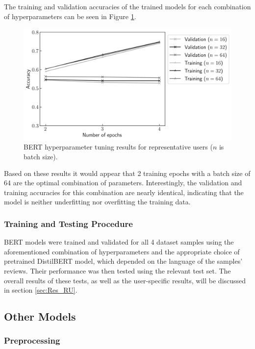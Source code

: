 The training and validation accuracies of the trained models for each combination of hyperparameters can be seen in Figure \ref{fig:DI_PU_BERTHP}.

\begin{figure}[ht]
    \centering
    \includegraphics[scale=0.7]{figures/05_impl/02_pu/plot_hyperparams_bert.png}
    \caption{BERT hyperparameter tuning results for representative users ($n$ is batch size).}
    \label{fig:DI_PU_BERTHP}
\end{figure}

Based on these results it would appear that 2 training epochs with a batch size of 64 are the optimal combination of parameters. Interestingly, the validation and training accuracies for this combination are nearly identical, indicating that the model is neither underfitting nor overfitting the training data.

\subsubsection{Training and Testing Procedure}

BERT models were trained and validated for all 4 dataset samples using the aforementioned combination of hyperparameters and the appropriate choice of pretrained DistilBERT model, which depended on the language of the samples' reviews. Their performance was then tested using the relevant test set. The overall results of these tests, as well as the user-specific results, will be discussed in section \ref{sec:Res_RU}.

\subsection{Other Models}

\subsubsection{Preprocessing}

